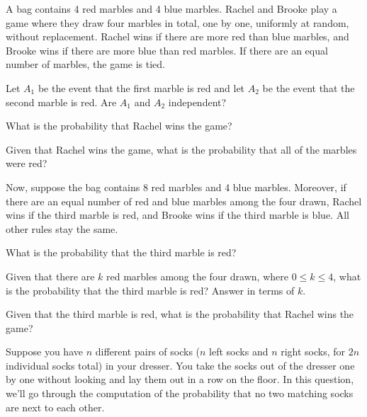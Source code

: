 \documentclass[11pt]{article}
\begin{document}
A bag contains 4 red marbles and 4 blue marbles. Rachel and Brooke play a game where they draw four marbles in total, one by one, uniformly at random, without replacement. Rachel wins if there are more red than blue marbles, and Brooke wins if there are more blue than red marbles. If there are an equal number of marbles, the game is tied.
\begin{Parts}
    \Part Let $A_1$ be the event that the first marble is red and let $A_2$ be the event that the second marble is red. Are $A_1$ and $A_2$ independent?
    
    \Part What is the probability that Rachel wins the game?
    
    \Part Given that Rachel wins the game, what is the probability that all of the marbles were red?
\end{Parts}
Now, suppose the bag contains 8 red marbles and 4 blue marbles. Moreover, if there are an equal number of red and blue marbles among the four drawn, Rachel wins if the third marble is red, and Brooke wins if the third marble is blue. All other rules stay the same.
\begin{ResumeParts}
    \Part What is the probability that the third marble is red?
    
    \Part Given that there are $k$ red marbles among the four drawn, where $0 \leq k \leq 4$, what is the probability that the third marble is red? Answer in terms of $k$.
    
    \Part Given that the third marble is red, what is the probability that Rachel wins the game?
    
\end{ResumeParts}

Suppose you have $n$ different pairs of socks ($n$ left socks and $n$ right socks, for $2n$ individual socks total) in your dresser. 
You take the socks out of the dresser one by one without looking and lay them out in a row on the floor. 
In this question, we'll go through the computation of the probability that no two matching socks are next to each other.
\end{document}
